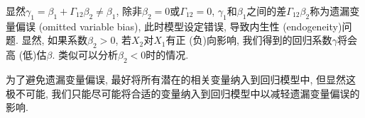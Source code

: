 \documentclass[cn, 12pt, math=mtpro2, bibstyle=apa, blue, twocol]{elegantbook}
\begin{document}
显然$\gamma_1=\beta_1+\Gamma_{12}\beta_2\neq\beta_1$, 除非$\beta_2=0$或$\Gamma_{12}=0$, $\gamma_1$和$\beta_1$之间的差$\Gamma_{12}\beta_2$称为遗漏变量偏误 (omitted variable bias), 此时模型设定错误, 导致内生性 (endogeneity)问题. 显然, 如果系数$\beta_2>0$, 若$X_2$对$X_1$有正 (负)向影响, 我们得到的回归系数$\gamma$将会高 (低)估$\beta$. 类似可以分析$\beta_2<0$时的情况.

为了避免遗漏变量偏误, 最好将所有潜在的相关变量纳入到回归模型中, 但显然这极不可能, 我们只能尽可能将合适的变量纳入到回归模型中以减轻遗漏变量偏误的影响.





\end{document}
